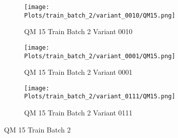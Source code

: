 \documentclass{DissertateFigs}
\begin{document}
\begin{figure}[t!]
\medskip

    \begin{subfigure}{0.32\textwidth}
    \texttt{[image: Plots/train\_batch\_2/variant\_0010/QM15.png]}
    \caption{QM 15 Train Batch 2 Variant 0010}
    \end{subfigure}
    \begin{subfigure}{0.32\textwidth}
    \texttt{[image: Plots/train\_batch\_2/variant\_0001/QM15.png]}
    \caption{QM 15 Train Batch 2 Variant 0001}
    \end{subfigure}

\medskip

    \begin{subfigure}{0.32\textwidth}
    \texttt{[image: Plots/train\_batch\_2/variant\_0111/QM15.png]}
    \caption{QM 15 Train Batch 2 Variant 0111}
    \end{subfigure}
\caption{QM 15 Train Batch 2}
    \end{figure}
\clearpage
\end{document}
